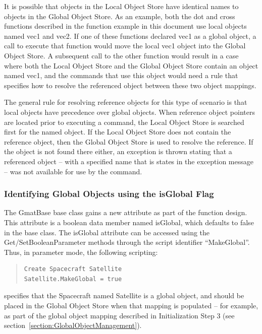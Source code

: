 It is possible that objects in the Local Object Store have identical names to objects in the Global
Object Store.  As an example, both the dot and cross functions described in the function example in
this document use local objects named vec1 and vec2.  If one of these functions declared vec1 as a
global object, a call to execute that function would move the local vec1 object into the Global
Object Store.  A subsequent call to the other function would result in a case where both the Local
Object Store and the Global Object Store contain an object named vec1, and the commands that use
this object would need a rule that specifies how to resolve the referenced object between these two
object mappings.

The general rule for resolving reference objects for this type of scenario is that local objects
have precedence over global objects.  When reference object pointers are located prior to executing
a command, the Local Object Store is searched first for the named object.  If the Local Object Store
does not contain the reference object, then the Global Object Store is used to resolve the
reference.  If the object is not found there either, an exception is thrown stating that a
referenced object -- with a specified name that is states in the exception message -- was not
available for use by the command.

\subsubsection{Identifying Global Objects using the isGlobal Flag}

The GmatBase base class gains a new attribute as part of the function design.  This attribute is a
boolean data member named isGlobal, which defaults to false in the base class.  The isGlobal
attribute can be accessed using the Get/SetBooleanParameter methods through the script
identifier ``MakeGlobal''.  Thus, in parameter mode, the following scripting:

\begin{quote}
\begin{verbatim}
Create Spacecraft Satellite
Satellite.MakeGlobal = true
\end{verbatim} 
\end{quote} 

\noindent specifies that the Spacecraft named Satellite is a global object, and should be placed in
the Global Object Store when that mapping is populated -- for example, as part of the global object
mapping described in Initialization Step 3 (see section~\ref{section:GlobalObjectManagement}).

